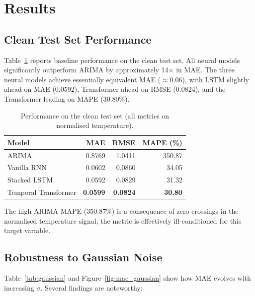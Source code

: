 \documentclass[runningheads]{llncs}
\begin{document}
\section{Results}
\label{sec:results}

\subsection{Clean Test Set Performance}
\label{sec:clean}

Table~\ref{tab:clean} reports baseline performance on the clean test set. All neural models significantly outperform ARIMA by approximately 14$\times$ in MAE. The three neural models achieve essentially equivalent MAE ($\approx 0.06$), with LSTM slightly ahead on MAE (0.0592), Transformer ahead on RMSE (0.0824), and the Transformer leading on MAPE (30.80\%).

\begin{table}[H]
\centering
\caption{Performance on the clean test set (all metrics on normalised temperature).}
\label{tab:clean}
\begin{tabular}{lrrr}
\toprule
\textbf{Model} & \textbf{MAE} & \textbf{RMSE} & \textbf{MAPE (\%)} \\
\midrule
ARIMA               & 0.8769 & 1.0411 & 350.87 \\
Vanilla RNN         & 0.0602 & 0.0860 & 34.05 \\
Stacked LSTM        & 0.0592 & 0.0829 & 31.32 \\
Temporal Transformer & \textbf{0.0599} & \textbf{0.0824} & \textbf{30.80} \\
\bottomrule
\end{tabular}
\end{table}

The high ARIMA MAPE (350.87\%) is a consequence of zero-crossings in the normalised temperature signal; the metric is effectively ill-conditioned for this target variable.

\subsection{Robustness to Gaussian Noise}
\label{sec:gaussian}

Table~\ref{tab:gaussian} and Figure~\ref{fig:mae_gaussian} show how MAE evolves with increasing $\sigma$. Several findings are noteworthy:
\end{document}
